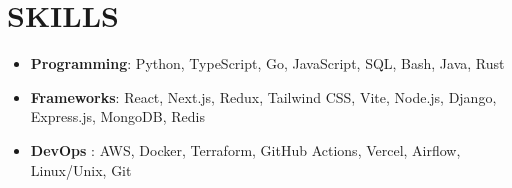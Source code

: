 \documentclass{resume}
\begin{document}






\section[SKILLS]{SKILLS}

\begin{itemize}
\item \textbf{Programming}: Python, TypeScript, Go, JavaScript, SQL, Bash, Java, Rust
\item \textbf{Frameworks}: React, Next.js, Redux, Tailwind CSS, Vite, Node.js, Django, Express.js, MongoDB, Redis
\item \textbf{DevOps }: AWS, Docker, Terraform, GitHub Actions, Vercel, Airflow, Linux/Unix, Git
\end{itemize}





\renewcommand\thefootnote{}
\addtocounter{footnote}{-1}
\renewcommand\thefootnote{\arabic{footnote}} %
 


\end{document}
